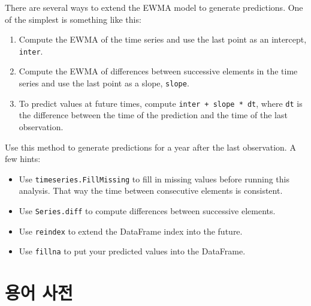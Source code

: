 \begin{exercise}
There are several ways to extend the EWMA model to generate predictions.
One of the simplest is something like this:

\begin{enumerate}

\item Compute the EWMA of the time series and use the last point
as an intercept, {\tt inter}.

\item Compute the EWMA of differences between successive elements in
the time series and use the last point as a slope, {\tt slope}.

\item To predict values at future times, compute {\tt inter + slope * dt},
where {\tt dt} is the difference between the time of the prediction and
the time of the last observation.

\end{enumerate}

Use this method to generate predictions for a year after the last
observation.  A few hints:

\begin{itemize}

\item Use {\tt timeseries.FillMissing} to fill in missing values
before running this analysis.  That way the time between consecutive
elements is consistent.

\item Use {\tt Series.diff} to compute differences between successive
elements.

\item Use {\tt reindex} to extend the DataFrame index into the future.

\item Use {\tt fillna} to put your predicted values into the DataFrame.

\end{itemize}

\end{exercise}


\section{용어 사전}

